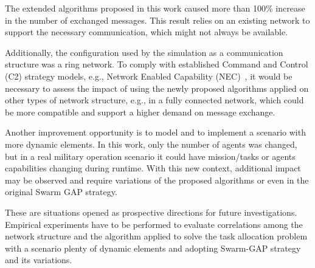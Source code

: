 The extended algorithms proposed in this work caused more than 100\% increase in the number of exchanged messages. This result relies on an existing network to support the necessary communication, which might not always be available. 

Additionally, the configuration used by the simulation as a communication structure was a ring network. To comply with established Command and Control (C2) strategy models, e.g., Network Enabled Capability (NEC)~\cite{CC01}, it would be necessary to assess the impact of using the newly proposed algorithms applied on other types of network structure, e.g., in a fully connected network, which could be more compatible and support a higher demand on message exchange.

Another improvement opportunity is to model and to implement a scenario with more dynamic elements. In this work, only the number of agents was changed, but in a real military operation scenario it could have mission/tasks or agents capabilities changing during runtime. With this new context, additional impact may be observed and require variations of the proposed algorithms or even in the original Swarm GAP strategy.

These are situations opened as prospective directions for future investigations. Empirical experiments have to be performed to evaluate correlations among the network structure and the algorithm applied to solve the task allocation problem with a scenario plenty of dynamic elements and adopting Swarm-GAP strategy and its variations.
